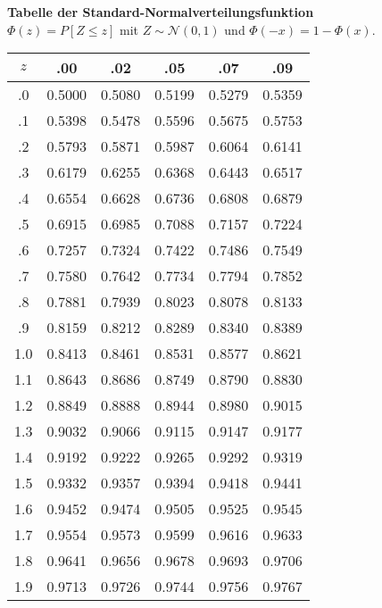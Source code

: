 \textbf{Tabelle der Standard-Normalverteilungsfunktion} \\
$\Phi(z)=P[Z \leq z]$ mit $Z \sim \mathcal{N}(0,1)$ und $\Phi(-x)=1-\Phi(x)$.
\begin{table}[h]
\centering
\begin{tabular}{|c|c|c|c|c|c|} 
\hline
$z$   & .00    & .02    & .05    & .07    & .09     \\ 
\hline
.0  & 0.5000 & 0.5080 & 0.5199 & 0.5279 & 0.5359  \\ 
\hline
.1 & 0.5398 & 0.5478 & 0.5596 & 0.5675 & 0.5753  \\ 
\hline
.2 & 0.5793 & 0.5871 & 0.5987 & 0.6064 & 0.6141  \\ 
\hline
.3  & 0.6179 & 0.6255 & 0.6368 & 0.6443 & 0.6517  \\ 
\hline
.4  & 0.6554 & 0.6628 & 0.6736 & 0.6808 & 0.6879  \\ 
\hline
.5 & 0.6915 & 0.6985 & 0.7088 & 0.7157 & 0.7224  \\ 
\hline
.6 & 0.7257 & 0.7324 & 0.7422 & 0.7486 & 0.7549  \\ 
\hline
.7  & 0.7580 & 0.7642 & 0.7734 & 0.7794 & 0.7852  \\ 
\hline
.8  & 0.7881 & 0.7939 & 0.8023 & 0.8078 & 0.8133  \\ 
\hline
.9  & 0.8159 & 0.8212 & 0.8289 & 0.8340 & 0.8389  \\ 
\hline
1.0 & 0.8413 & 0.8461 & 0.8531 & 0.8577 & 0.8621  \\ 
\hline
1.1 & 0.8643 & 0.8686 & 0.8749 & 0.8790 & 0.8830  \\ 
\hline
1.2 & 0.8849 & 0.8888 & 0.8944 & 0.8980 & 0.9015  \\ 
\hline
1.3 & 0.9032 & 0.9066 & 0.9115 & 0.9147 & 0.9177  \\ 
\hline
1.4 & 0.9192 & 0.9222 & 0.9265 & 0.9292 & 0.9319  \\ 
\hline
1.5 & 0.9332 & 0.9357 & 0.9394 & 0.9418 & 0.9441  \\ 
\hline
1.6 & 0.9452 & 0.9474 & 0.9505 & 0.9525 & 0.9545  \\ 
\hline
1.7 & 0.9554 & 0.9573 & 0.9599 & 0.9616 & 0.9633  \\ 
\hline
1.8 & 0.9641 & 0.9656 & 0.9678 & 0.9693 & 0.9706  \\ 
\hline
1.9 & 0.9713 & 0.9726 & 0.9744 & 0.9756 & 0.9767  \\
\hline
\end{tabular}
\end{table}
